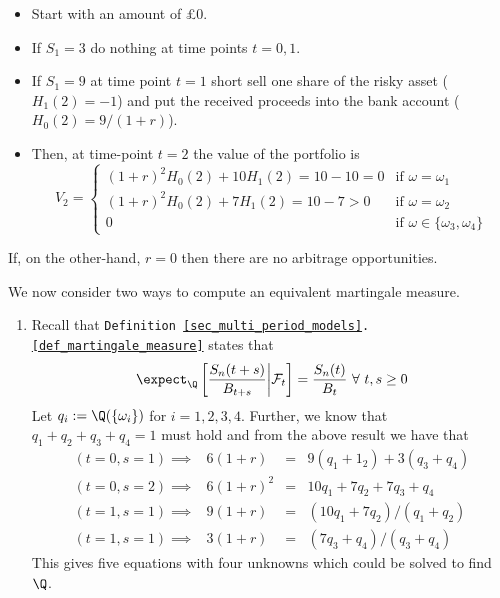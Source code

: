 \documentclass[11pt,a4paper]{article}
\begin{document}
\begin{example}{}
    \begin{itemize}
      \item Start with an amount of £0.
      \item If $S_1=3$ do nothing at time points $t=0,1$.
      \item If $S_1=9$ at time point $t=1$ short sell one share of the risky asset ($H_1(2)=-1$) and put the received proceeds into the bank account ($H_0(2)=9/(1+r)$).
      \item Then, at time-point $t=2$ the value of the portfolio is
      \[ V_2=\begin{cases}
        (1+r)^2H_0(2)+10H_1(2)=10-10=0&\text{if }\omega=\omega_1\\
        (1+r)^2H_0(2)+7H_1(2)=10-7>0&\text{if }\omega=\omega_2\\
        0&\text{if }\omega\in\{\omega_3,\omega_4\}\end{cases} \]
    \end{itemize}
    If, on the other-hand, $r=0$ then there are no arbitrage opportunities.
    \par We now consider two ways to compute an equivalent martingale measure.
    \begin{enumerate}
      \item
      \par Recall that \texttt{Definition \ref{sec_multi_period_models}.\ref{def_martingale_measure}} states that
      \[ \expect_\Q\left[\frac{S_n(t+s)}{B_{t+s}}\bigg|\mathcal{F}_t\right]=\frac{S_n(t)}{B_t}\ \forall\ t,s\geq0 \]
      Let $q_i:=\Q(\{\omega_i\})$ for $i=1,2,3,4$. Further, we know that $q_1+q_2+q_3+q_4=1$ must hold and from the above result we have that
      \[\begin{array}{rrcl}
      (t=0,s=1)\implies&6(1+r)&=&9(q_1+1_2)+3(q_3+q_4)\\
      (t=0,s=2)\implies&6(1+r)^2&=&10q_1+7q_2+7q_3+q_4\\
      (t=1,s=1)\implies&9(1+r)&=&(10q_1+7q_2)/(q_1+q_2)\\
      (t=1,s=1)\implies&3(1+r)&=&(7q_3+q_4)/(q_3+q_4)
      \end{array}\]
      This gives five equations with four unknowns which could be solved to find $\Q$.


\end{enumerate}
\end{example}
\end{document}
